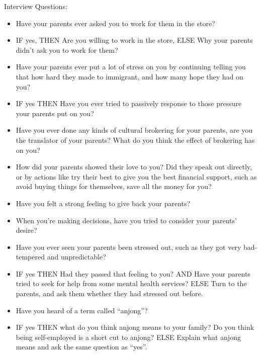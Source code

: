 Interview Questions:
\begin{itemize}
  \item Have your parents ever asked you to work for them in the store?
  \item IF yes, THEN Are you willing to work in the store, ELSE Why your parents
  didn't ask you to work for them?
  \item Have your parents ever put a lot of stress on you by continuing telling
  you that how hard they made to immigrant, and how many hope they had on you?
  \item IF yes THEN Have you ever tried to passively response to those pressure
  your parents put on you?
  \item Have you ever done any kinds of cultural brokering for your parents,
  are you the translator of your parents? What do you think the effect of brokering has on you?
  \item How did your parents showed their love to you? Did they speak out
  directly, or by actions like try their best to give you the best financial support, 
  such as avoid buying things for themselves, save all the money for you?
  \item Have you felt a strong feeling to give back your parents?
  \item When you're making decisions, have you tried to consider your
  parents' desire?
  \item Have you ever seen your parents been stressed out, such as they got very
  bad-tempered and unpredictable?
  \item IF yes THEN Had they passed that feeling to you? AND Have your parents
  tried to seek for help from some mental health services? ELSE Turn to the
  parents, and ask them whether they had stressed out before.
  \item Have you heard of a term called ``anjong''\cite[p.~41]{book:ISelected}? 
  \item IF yes THEN what do you think anjong means to your family? Do you think
  being self-employed is a short cut to anjong? ELSE Explain what anjong means
  and ask the same question as ``yes''.
\end{itemize}
